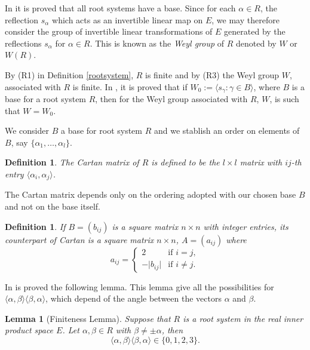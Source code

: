 \documentclass[12pt,a4paper]{article}
\newtheorem{Lemma}[Theorem]{Lemma}
\newtheorem{definition}[Theorem]{Definition}
\begin{document}
In \cite{algebralie} it is proved that all root systems have a base. Since for each $\alpha \in R$, the reflection $s_{\alpha}$ which acts as an invertible linear map on $E$,  we may therefore consider the group of invertible linear transformations of $E$ generated by the reflections $s_{\alpha}$ for $\alpha \in R$. This is known as the \textit{Weyl group} of $R$ denoted by $W$ or $W(R)$. 

By  (R1) in  Definition \ref{rootsystem}, $R$ is finite and by (R3) the Weyl group $W$, associated with $R$ is finite. In \cite{algebralie}, it is proved that if $W_0:= \langle s_{\gamma}: \gamma \in B \rangle$, where $B$ is a base for a root system $R$, then for the Weyl group associated with $R$, $W$, is such that $W=W_0$.

We consider $B$ a base for root system $R$ and we stablish an order on elements of $B$, say $\lbrace \alpha_1 , \ldots , \alpha_l\rbrace$.

\begin{definition}
The \textit{Cartan matrix} of $R$ is defined to be the $l \times l$ matrix with $ij$-th entry $\langle \alpha_i , \alpha_j \rangle$.
\end{definition}

The Cartan matrix depends only on the ordering adopted with our chosen base $B$ and not on the base itself.

\begin{definition}
If $B=\left( b_{ij}\right)$ is a square matrix $n \times n$ with integer entries, its counterpart of Cartan is a square matrix $n \times n$, $A=(a_{ij})$ where
\begin{equation*}
a_{ij}=\left\{
\begin{array}{ll}
2 & \text{if } i=j,\\
-\vert b_{ij}\vert & \text{if } i\neq j.
\end{array} \right.
\end{equation*}
\end{definition}

In \cite{algebralie} is proved the following lemma. This lemma give all the possibilities for $\langle \alpha, \beta \rangle \langle \beta, \alpha \rangle$, which depend of the angle between the vectors $\alpha$ and $\beta$.

\begin{Lemma}[Finiteness Lemma]
Suppose that $R$ is a root system in the real inner product space $E$. Let $\alpha, \beta \in R$ with $\beta \neq \pm \alpha$, then
$$\langle \alpha, \beta \rangle \langle \beta, \alpha \rangle \in \lbrace 0,1,2,3 \rbrace.$$
\label{lem11}
\end{Lemma}
\end{document}
